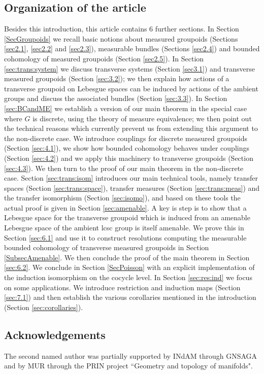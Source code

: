 \documentclass[11pt, oneside]{amsart}
\theoremstyle{definition}
\theoremstyle{remark}
\theoremstyle{TheoremNum}
\begin{document}
\subsection{Organization of the article} Besides this introduction, this article contains $6$ further sections. In Section \ref{SecGroupoids} we recall basic notions about measured groupoids (Sections \ref{sec2.1}, \ref{sec2.2} and \ref{sec2.3}), measurable bundles (Sections \ref{sec2.4}) and bounded cohomology of measured groupoids (Section \ref{sec2.5}).
In Section \ref{sec:trans:system} we discuss transverse systems (Section \ref{sec3.1}) and transverse measured groupoids (Section \ref{sec:3.2}); we then explain how actions of a transverse groupoid on Lebesgue spaces can be induced by actions of the ambient groups and discuss the associated bundles (Section \ref{sec:3.3}). In Section \ref{sec:BCandME} we establish a version of our main theorem in the special case where $G$ is discrete, using the theory of measure equivalence; we then point out the technical reasons which currently prevent us from extending this argument to the non-discrete case. We introduce couplings for discrete measured groupoids (Section \ref{sec:4.1}), we show how bounded cohomology behaves under couplings (Section \ref{sec:4.2}) and we apply this machinery to transverse groupoids (Section \ref{sec:4.3}). 
We then turn to the proof of our main theorem in the non-discrete case. Section \ref{sec:trans:isom} introduces our main technical tools, namely transfer spaces (Section \ref{sec:trans:space}), transfer measures (Section \ref{sec:trans:meas}) and the transfer isomorphism (Section \ref{sec:isomo}), and based on these tools the actual proof is given in Section \ref{sec:amenable}. A key is step is to show that a Lebesgue space for the transverse groupoid which is induced from an amenable Lebesgue space of the ambient lcsc group is itself amenable. We prove this in Section \ref{sec:6.1} and use it to construct resolutions computing the measurable bounded cohomology of transverse measured groupoids in Section \ref{SubsecAmenable}.
We then conclude the proof of the main theorem in Section \ref{sec:6.2}. We conclude in Section \ref{SecPoisson} with an explicit implementation of the induction isomorphism on the cocycle level. In Section \ref{sec:res:ind} we focus on some applications. We introduce restriction and induction maps (Section \ref{sec:7.1}) and then establish the various corollaries mentioned in the introduction (Section \ref{sec:corollaries}).  

\subsection*{Acknowledgements} The second named author was partially supported by INdAM through GNSAGA and by MUR through the PRIN project ``Geometry and topology of manifolds". 
\end{document}
